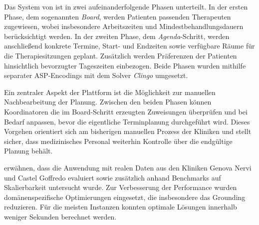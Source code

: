 Das System von \textcite{cardellini2023solvingrehabilitationschedulingproblems} ist in zwei aufeinanderfolgende Phasen unterteilt. In der ersten Phase, dem sogenannten \textit{Board}, werden Patienten passenden Therapeuten zugewiesen, wobei insbesondere Arbeitszeiten und Mindestbehandlungsdauern berücksichtigt werden. In der zweiten Phase, dem \textit{Agenda}-Schritt, werden anschließend konkrete Termine, Start- und Endzeiten sowie verfügbare Räume für die Therapiesitzungen geplant. Zusätzlich werden Präferenzen der Patienten hinsichtlich bevorzugter Tageszeiten einbezogen. Beide Phasen wurden mithilfe separater ASP-Encodings mit dem Solver \textit{Clingo} umgesetzt.

Ein zentraler Aspekt der Plattform ist die Möglichkeit zur manuellen Nachbearbeitung der Planung. Zwischen den beiden Phasen können Koordinatoren die im Board-Schritt erzeugten Zuweisungen überprüfen und bei Bedarf anpassen, bevor die eigentliche Terminplanung durchgeführt wird. Dieses Vorgehen orientiert sich am bisherigen manuellen Prozess der Kliniken und stellt sicher, dass medizinisches Personal weiterhin Kontrolle über die endgültige Planung behält.

\textcite{cardellini2023solvingrehabilitationschedulingproblems} erwähnen, dass die Anwendung mit realen Daten aus den Kliniken Genova Nervi und Castel Goffredo evaluiert sowie zusätzlich anhand Benchmarks auf Skalierbarkeit untersucht wurde. Zur Verbesserung der Performance wurden domänenspezifische Optimierungen eingesetzt, die insbesondere das Grounding reduzieren. Für die meisten Instanzen konnten optimale Lösungen innerhalb weniger Sekunden berechnet werden.



